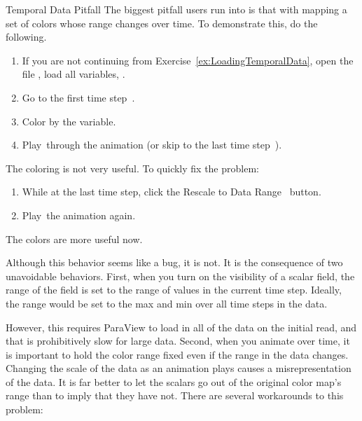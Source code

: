 \begin{exercise}{Temporal Data Pitfall}
  \label{ex:TemporalDataPitfall}%
  The biggest pitfall users run into is that with mapping a set of colors
  whose range changes over time.  To demonstrate this, do the following.

  \begin{enumerate}
  \item If you are not continuing from
    Exercise~\ref{ex:LoadingTemporalData}, open the file ,
    load all variables, \apply.
  \item Go to the first time step~\vcrFirst.
  \item Color by the  variable.
  \item Play~\vcrPlay through the animation (or skip to the last time
    step~\vcrLast).
    \savecounter
  \end{enumerate}
  The coloring is not very useful.  To quickly fix the problem:
  \begin{enumerate}
    \restorecounter
  \item While at the last time step, click the Rescale to Data
    Range~ button.
  \item Play~\vcrPlay the animation again.
  \end{enumerate}

  The colors are more useful now.
\end{exercise}

Although this behavior seems like a bug, it is not.  It is the consequence
of two unavoidable behaviors.  First, when you turn on the visibility of a
scalar field, the range of the field is set to the range of values in the
current time step.  Ideally, the range would be set to the max and min over
all time steps in the data.

However, this requires ParaView to load
in all of the data on the initial read, and that is prohibitively
slow for large data.  Second, when you animate over time, it is important
to hold the color range fixed even if the range in the data changes.
Changing the scale of the data as an animation plays causes a
misrepresentation of the data.  It is far better to let the scalars go out
of the original color map's range than to imply that they have not.  There
are several workarounds to this problem:

